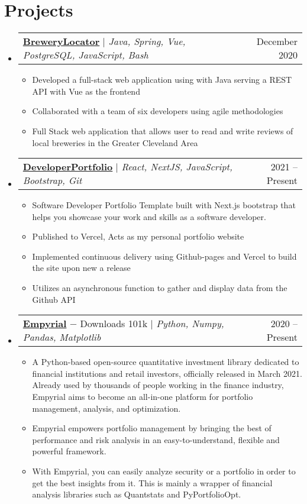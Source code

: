 \documentclass[letterpaper,11pt]{article}
\makeatletter
\newcommand{\resumeItem}[1]{
  \item\small{
    {#1 \vspace{-2pt}}
  }
}
\newcommand{\resumeProjectHeading}[2]{
    \item
    \begin{tabular*}{0.97\textwidth}{l@{\extracolsep{\fill}}r}
      \small#1 & #2 \\
    \end{tabular*}\vspace{-5pt}
}
\newcommand{\resumeSubHeadingListStart}{\begin{itemize}[leftmargin=0.15in, label={}]}
\newcommand{\resumeSubHeadingListEnd}{\end{itemize}}
\newcommand{\resumeItemListStart}{\begin{itemize}}
\newcommand{\resumeItemListEnd}{\end{itemize}\vspace{-4pt}}
\makeatother
\begin{document}
{{\section{Projects}
    \resumeSubHeadingListStart
      \resumeProjectHeading
          {\textbf{\href{https://github.com/BrendanGlancy/BreweryLocater}{BreweryLocator}} $|$ \emph{Java, Spring, Vue, PostgreSQL, JavaScript, Bash}}{December 2020}
          \resumeItemListStart
            \resumeItem{Developed a full-stack web application using with Java serving a REST API with Vue as the frontend}
            \resumeItem{Collaborated with a team of six developers using agile methodologies}
            \resumeItem{Full Stack web application that allows user to read and write reviews of local breweries in the Greater Cleveland Area}
          \resumeItemListEnd
      \resumeProjectHeading
          {\textbf{\href{https://dev-port-lac.vercel.app/}{DeveloperPortfolio}} $|$ \emph{React, NextJS, JavaScript, Bootstrap, Git}}{2021 -- Present}
          \resumeItemListStart
            \resumeItem{Software Developer Portfolio Template built with Next.js bootstrap that helps you showcase your work and skills as a software developer.}
            \resumeItem{Published to Vercel, Acts as my personal portfolio website}
            \resumeItem{Implemented continuous delivery using Github-pages and Vercel to build the site upon new a release}
            \resumeItem{Utilizes an asynchronous function to gather and display data from the Github API}
          \resumeItemListEnd
      \resumeProjectHeading
          {\textbf{\href{https://github.com/ssantoshp/Empyrial}{Empyrial}} $-$ \emph{}{Downloads 101k} $|$ \emph{Python, Numpy, Pandas, Matplotlib}}{2020 -- Present}
          \resumeItemListStart
            \resumeItem{A Python-based open-source quantitative investment library dedicated to financial institutions and retail investors, officially released in March 2021. Already used by thousands of people working in the finance industry, Empyrial aims to become an all-in-one platform for portfolio management, analysis, and optimization.}
            \resumeItem{Empyrial empowers portfolio management by bringing the best of performance and risk analysis in an easy-to-understand, flexible and powerful framework.}
            \resumeItem{With Empyrial, you can easily analyze security or a portfolio in order to get the best insights from it. This is mainly a wrapper of financial analysis libraries such as Quantstats and PyPortfolioOpt.}
          \resumeItemListEnd
    \resumeSubHeadingListEnd



}}
\end{document}
